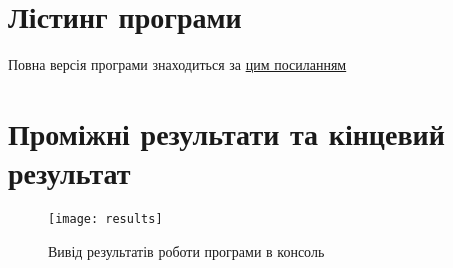 \documentclass{report}
\begin{document}
\section*{Лістинг програми}

Повна версія програми знаходиться за \href{https://github.com/rmbozhko/SikorskyLabs/tree/master/num_meth/lab1/gauss/src}{цим посиланням}

\section*{Проміжні результати та кінцевий результат}
\begin{figure}[H]
    \centering
    \texttt{[image: results]}
    \caption{Вивід результатів роботи програми в консоль}
    \label{pic:results}
\end{figure}
\begin{comment}
Роширена верхня трикутна матриця, що отримана в ході прямого ходу методу Гауса:
\[A =\begin{pmatrix}
3,81 && 0,25 && 1,28 && 1,75 && 4,21\\
0,00 && -1,98 && -8,16 && 0,92 && -8,43\\
0,00 && 0,00 && -8,39 && 0,51 && -9,43\\
0,00 && 0,00 && 0,00 && 2,41 && -0,92\\
\end{pmatrix}\]
Розв'язок системи: $x = \begin{pmatrix}
0,941074\\
-0,452852\\
1,100005\\
-0,383019\\
\end{pmatrix}$
\end{comment}
\end{document}
